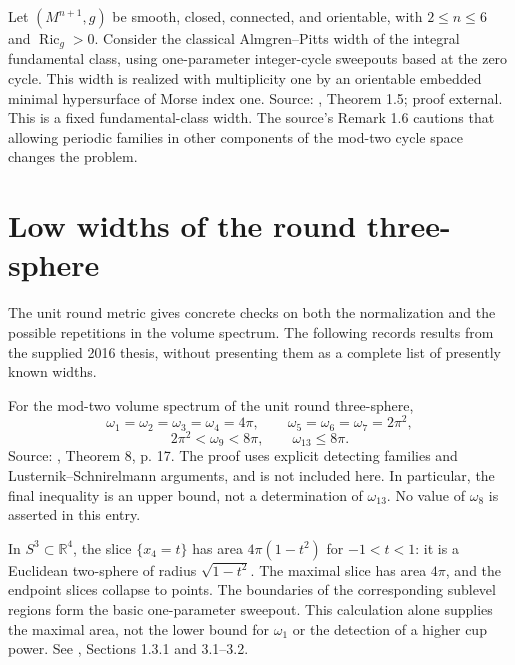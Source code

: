 \begin{theorem}\label{thm:ricci-one-parameter}
Let $(M^{n+1},g)$ be smooth, closed, connected, and orientable, with $2\leq n\leq6$ and $\operatorname{Ric}_g>0$. Consider the classical Almgren--Pitts width of the integral fundamental class, using one-parameter integer-cycle sweepouts based at the zero cycle. This width is realized with multiplicity one by an orientable embedded minimal hypersurface of Morse index one. Source: \cite{KMN}, Theorem 1.5; proof external. This is a fixed fundamental-class width. The source's Remark 1.6 cautions that allowing periodic families in other components of the mod-two cycle space changes the problem.
\end{theorem}

\chapter{Low widths of the round three-sphere}\label{sec:round-sphere-widths}
The unit round metric gives concrete checks on both the normalization and the possible repetitions in the volume spectrum. The following records results from the supplied 2016 thesis, without presenting them as a complete list of presently known widths.

\begin{theorem}\label{thm:nurser-widths}
For the mod-two volume spectrum of the unit round three-sphere,
\[
 \omega_1=\omega_2=\omega_3=\omega_4=4\pi,\qquad
 \omega_5=\omega_6=\omega_7=2\pi^2,
\]
\[
 2\pi^2<\omega_9<8\pi,\qquad \omega_{13}\leq8\pi.
\]
Source: \cite{Nurser}, Theorem 8, p. 17. The proof uses explicit detecting families and Lusternik--Schnirelmann arguments, and is not included here. In particular, the final inequality is an upper bound, not a determination of $\omega_{13}$. No value of $\omega_8$ is asserted in this entry.
\end{theorem}

\begin{example}\label{ex:latitude-area}
In $S^3\subset\mathbb R^4$, the slice $\{x_4=t\}$ has area $4\pi(1-t^2)$ for $-1<t<1$: it is a Euclidean two-sphere of radius $\sqrt{1-t^2}$. The maximal slice has area $4\pi$, and the endpoint slices collapse to points. The boundaries of the corresponding sublevel regions form the basic one-parameter sweepout. This calculation alone supplies the maximal area, not the lower bound for $\omega_1$ or the detection of a higher cup power. See \cite{Nurser}, Sections 1.3.1 and 3.1--3.2.
\end{example}

